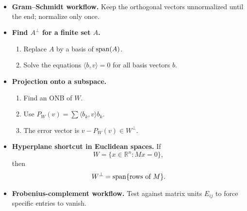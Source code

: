 \begin{itemize}[leftmargin=*]
\item \textbf{Gram--Schmidt workflow.} Keep the orthogonal vectors unnormalized until the end; normalize only once.

\item \textbf{Find $A^\perp$ for a finite set $A$.}
\begin{enumerate}[leftmargin=*]
\item Replace $A$ by a basis of $\operatorname{span}(A)$.
\item Solve the equations $\langle b,v\rangle=0$ for all basis vectors $b$.
\end{enumerate}

\item \textbf{Projection onto a subspace.}
\begin{enumerate}[leftmargin=*]
\item Find an ONB of $W$.
\item Use $P_W(v)=\sum \langle b_k,v\rangle b_k$.
\item The error vector is $v-P_W(v)\in W^\perp$.
\end{enumerate}

\item \textbf{Hyperplane shortcut in Euclidean spaces.} If
\[
W=\{x\in\mathbb R^n:Mx=0\},
\]
then
\[
W^\perp=\operatorname{span}\{\text{rows of }M\}.
\]

\item \textbf{Frobenius-complement workflow.} Test against matrix units $E_{ij}$ to force specific entries to vanish.
\end{itemize}
